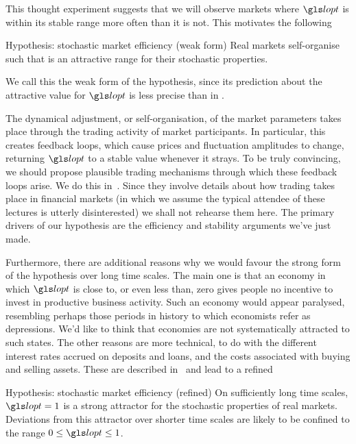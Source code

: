 This thought experiment suggests that we will observe markets where $\lopt$ is within its stable range more often than it is not. This motivates the following
\begin{keypts}{Hypothesis: stochastic market efficiency (weak form)}
Real markets self-organise such that
\be
{}
\ee
is an attractive range for their stochastic properties.
\end{keypts}
We call this the weak form of the hypothesis, since its prediction about the attractive value for $\lopt$ is less precise than in .

The dynamical adjustment, or self-organisation, of the market parameters takes place through the trading activity of market participants. In particular, this creates feedback loops, which cause prices and fluctuation amplitudes to change, returning $\lopt$ to a stable value whenever it strays. To be truly convincing, we should propose plausible trading mechanisms through which these feedback loops arise. We do this in~\cite{PetersAdamou2013}. Since they involve details about how trading takes place in financial markets (in which we assume the typical attendee of these lectures is utterly disinterested) we shall not rehearse them here. The primary drivers of our hypothesis are the efficiency and stability arguments we've just made.

Furthermore, there are additional reasons why we would favour the strong form of the hypothesis over long time scales. The main one is that an economy in which $\lopt$ is close to, or even less than, zero gives people no incentive to invest in productive business activity. Such an economy would appear paralysed, resembling perhaps those periods in history to which economists refer as depressions. We'd like to think that economies are not systematically attracted to such states. The other reasons are more technical, to do with the different interest rates accrued on deposits and loans, and the costs associated with buying and selling assets. These are described in~\cite{PetersAdamou2013} and lead to a refined
\begin{keypts}{Hypothesis: stochastic market efficiency (refined)}
On sufficiently long time scales, $\lopt=1$ is a strong attractor for the stochastic properties of real markets. Deviations from this attractor over shorter time scales are likely to be confined to the range $0\leq\lopt\leq1$.
\end{keypts}

